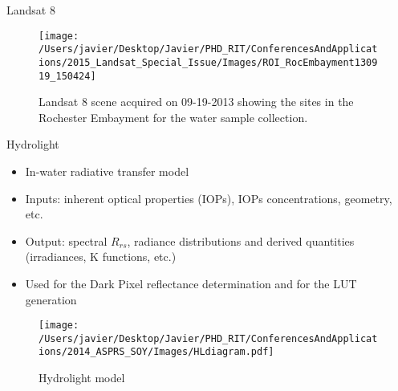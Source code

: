 \documentclass{beamer}
\begin{document}
\begin{frame}{}
\begin{columns}[t]
\begin{column}{.31\linewidth}
\begin{block}{Landsat 8}
\begin{figure}[htb]
  \centering
  \texttt{[image: /Users/javier/Desktop/Javier/PHD\_RIT/ConferencesAndApplications/2015\_Landsat\_Special\_Issue/Images/ROI\_RocEmbayment130919\_150424]}
  \caption{Landsat 8 scene acquired on 09-19-2013 showing the sites in the Rochester Embayment for the water sample collection. \label{fig:091913Sites} } 
\end{figure}

\vspace{-.5cm}
\end{block}
\begin{block}{Hydrolight}
\small
\begin{itemize}
  \item In-water radiative transfer model
  \vspace{0.5cm}
  \item Inputs: inherent optical properties (IOPs), IOPs concentrations, geometry, etc.
  \vspace{0.5cm}
  \item Output: spectral $R_{rs}$, radiance distributions and derived quantities (irradiances, K functions, etc.)
  \vspace{0.5cm}
  \item Used for the Dark Pixel reflectance determination and for the LUT generation
\end{itemize}
\vspace{1cm}
\begin{figure}[H]
    \texttt{[image: /Users/javier/Desktop/Javier/PHD\_RIT/ConferencesAndApplications/2014\_ASPRS\_SOY/Images/HLdiagram.pdf]}
    \caption{Hydrolight model}
\end{figure}
\end{block}

\end{column}   


\end{columns}
\end{frame}
\end{document}
